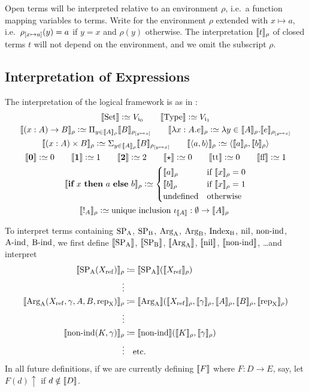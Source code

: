 \documentclass{article}
\begin{document}
Open terms will be interpreted relative to an environment $\rho$, i.e.\ a
function mapping variables to terms. Write  for the
environment $\rho$ extended with $x \mapsto a$, i.e.\ $\rhoextend{x}{a}(y) = a$
if $y = x$ and $\rho(y)$ otherwise. The interpretation $\sem{t}_{\rho}$ of closed
terms $t$ will not depend on the environment, and we omit the subscript $\rho$.

\subsection{Interpretation of Expressions}
\noindent 
The interpretation of the logical framework is as in
\cite{dybjersetzer1999finax}:
\begin{gather*}
\sem{\Set} \colonsimeq V_{\cardz} \qquad \sem{\TYPE} \colonsimeq V_{\cardi} \\
\sem{(x : A) \to B}_\rho \colonsimeq \Pi_{y \in
  \sem{A}_\rho}\sem{B}_{\rhoextend{y}{x}} \qquad
\sem{\lambda x:A.e}_\rho \colonsimeq \lambda y \in
\sem{A}_\rho.\sem{e}_{\rhoextend{y}{x}} \\
\sem{(x : A) \times B}_\rho \colonsimeq \Sigma_{y \in
  \sem{A}_\rho}\sem{B}_{\rhoextend{y}{x}} \qquad
\sem{\langle a, b \rangle}_\rho \colonsimeq \langle \sem{a}_\rho ,
\sem{b}_\rho\rangle \\
\sem{\zero} \colonsimeq 0 \qquad \sem{\one} \colonsimeq 1 \qquad
\sem{\two} \colonsimeq 2 \qquad \sem{\oneelt} \colonsimeq 0 \qquad \sem{\twott} \colonsimeq 0 \qquad
\sem{\twoff} \colonsimeq 1\\
\sem{\IF~x~\THEN~a~\ELSE~b}_\rho \colonsimeq
\begin{cases}
\sem{a}_\rho & \text{if $\sem{x}_\rho = 0$} \\
\sem{b}_\rho & \text{if $\sem{x}_\rho = 1$} \\
\text{undefined} & \text{otherwise} \\
\end{cases} \\
\sem{!_A}_\rho \colonsimeq \text{unique inclusion $\iota_{\sem{A}} : \emptyset \to \sem{A}_\rho$ }
\end{gather*}

To interpret terms containing $\SPA$, $\SPB$, $\ArgA$, $\ArgB$, $\IndexB$, 
$\nilA$, $\nonindA$, $\AindA$, $\BindA$, we first define $\sem{\SPA}$,
$\sem{\SPB}$, $\sem{\ArgA}$, $\sem{\nilA}$, $\sem{\nonindA}$, \ldots and interpret
\begin{align*}
\sem{\SPA(\Xref)}_\rho &\coloneqq \sem{\SPA}(\sem{\Xref}_\rho) \\
\vdots \\
\sem{\ArgA(\Xref, \gamma, A, B, \repA)}_\rho &\coloneqq
\sem{\ArgA}(\sem{\Xref}_\rho, \sem{\gamma}_\rho, \sem{A}_\rho, \sem{B}_\rho, \sem{\repA}_\rho) \\
\vdots \\
\sem{\nonindA(K, \gamma)}_\rho &\coloneqq \sem{\nonindA}(\sem{K}_\rho,
\sem{\gamma}_\rho) \\
\vdots & \text{\quad etc.}
\end{align*}
In all future definitions, if we are currently defining $\sem{F}$ where $F : D
\to E$, say, let $F(d)\uparrow$ if $d \notin \sem{D}$.
\end{document}
